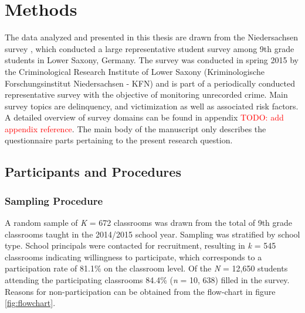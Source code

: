 \documentclass[a4paper,12pt]{article} %
\newcommand{\todo}[1]{\textcolor{red}{TODO: #1}\PackageWarning{TODO:}{#1!}} %
\begin{document}

\section{Methods}
The data analyzed and presented in this thesis are drawn from the Niedersachsen survey \parencite{bergmann_jugendliche_2017},
which conducted a large representative student survey among 9th grade students in Lower Saxony, Germany.
The survey was conducted in spring 2015 by the Criminological Research Institute of Lower Saxony (Kriminologische Forschungsinstitut Niedersachsen - KFN) and is part of a periodically conducted representative survey with the objective of monitoring unrecorded crime.
Main survey topics are delinquency, and victimization as well as associated risk factors.
A detailed overview of survey domains can be found in appendix \todo{add appendix reference}.
The main body of the manuscript only describes the questionnaire parts pertaining to the present research question.

\subsection{Participants and Procedures}

\subsubsection{Sampling Procedure}
A random sample of \textit{K} = 672 classrooms was drawn from the total of 9th grade classrooms taught in the 2014/2015 school year.
Sampling was stratified by school type.
School principals were contacted for recruitment, resulting in \textit{k} = 545 classrooms indicating willingness to participate, which corresponds to a participation rate of 81.1\% on the classroom level.
Of the \textit{N} = 12,650 students attending the participating classrooms 84.4\% (\textit{n} = 10, 638) filled in the survey.
Reasons for non-participation can be obtained from the flow-chart in figure \ref{fig:flowchart}.
\end{document}
